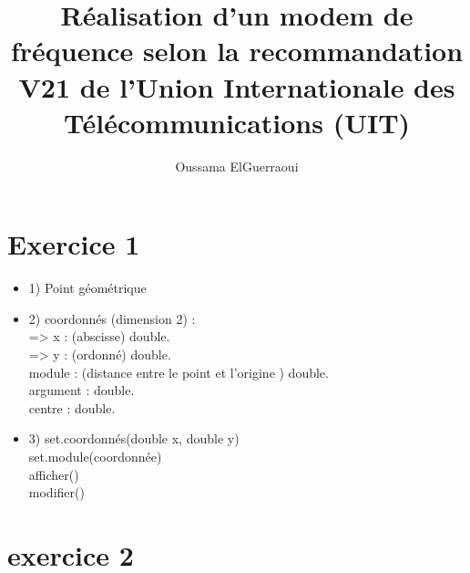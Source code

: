 \documentclass[frenchb]{article}
\begin{document}
\title{\vspace{4cm} {Réalisation d'un modem de fréquence selon la recommandation V21 de
l'Union Internationale des Télécommunications (UIT)}}
\author{ Oussama ElGuerraoui}
 


\section{Exercice 1}
\begin{itemize}
\item 1)  Point géométrique
\item  2)  coordonnés (dimension 2) :
     \\ => x : (abscisse) double. 
    \\ => y : (ordonné) double.
  \\ module : (distance entre le point et l'origine ) double.
  \\ argument : double.
  \\ centre : double.
\item 3)  set.coordonnés(double x, double y)
        \\ set.module(coordonnée)
        \\ afficher()
        \\ modifier()
     

\end{itemize}

\section{exercice 2}
\end{document}
